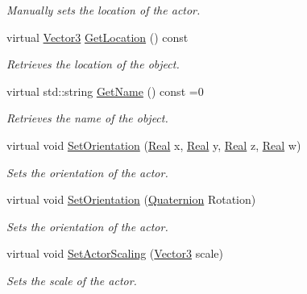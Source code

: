 \begin{DoxyCompactItemize}
\begin{DoxyCompactList}\small\item\em Manually sets the location of the actor. \item\end{DoxyCompactList}\item 
virtual \hyperlink{classphys_1_1Vector3}{Vector3} \hyperlink{classphys_1_1ActorBase_a777b4ea4d6881af76c646b1ba9324d96}{GetLocation} () const 
\begin{DoxyCompactList}\small\item\em Retrieves the location of the object. \item\end{DoxyCompactList}\item 
virtual std::string \hyperlink{classphys_1_1ActorBase_a8309f5bd133c936abe3a856b0240159f}{GetName} () const =0
\begin{DoxyCompactList}\small\item\em Retrieves the name of the object. \item\end{DoxyCompactList}\item 
virtual void \hyperlink{classphys_1_1ActorBase_adbf0cc77031f22597a799fd0f7f8216d}{SetOrientation} (\hyperlink{namespacephys_af7eb897198d265b8e868f45240230d5f}{Real} x, \hyperlink{namespacephys_af7eb897198d265b8e868f45240230d5f}{Real} y, \hyperlink{namespacephys_af7eb897198d265b8e868f45240230d5f}{Real} z, \hyperlink{namespacephys_af7eb897198d265b8e868f45240230d5f}{Real} w)
\begin{DoxyCompactList}\small\item\em Sets the orientation of the actor. \item\end{DoxyCompactList}\item 
virtual void \hyperlink{classphys_1_1ActorBase_ac4b0bf1eff730d94f72d04957efea69d}{SetOrientation} (\hyperlink{classphys_1_1Quaternion}{Quaternion} Rotation)
\begin{DoxyCompactList}\small\item\em Sets the orientation of the actor. \item\end{DoxyCompactList}\item 
virtual void \hyperlink{classphys_1_1ActorBase_a1ac7c692d7f88f39ebb1c1db5deba251}{SetActorScaling} (\hyperlink{classphys_1_1Vector3}{Vector3} scale)
\begin{DoxyCompactList}\small\item\em Sets the scale of the actor. \item\end{DoxyCompactList}\item 

\end{DoxyCompactItemize}
